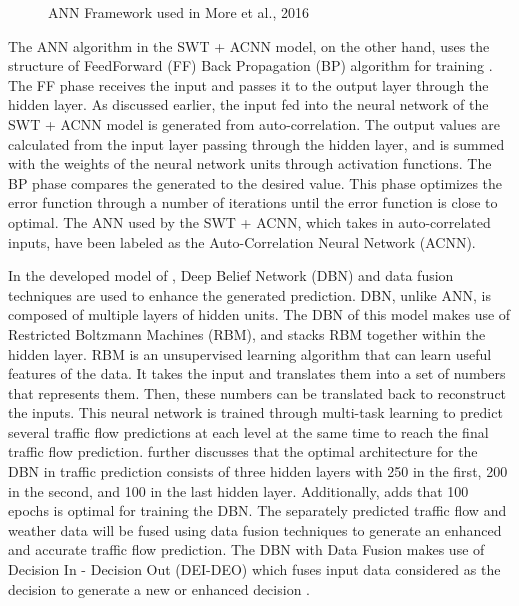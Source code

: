 \begin{figure}[h]
	\centering
	\captionsetup{justification=centering}
	\caption{ANN Framework used in More et al., 2016}
	\label{fig:annJordan}
\end{figure}

The ANN algorithm in the SWT + ACNN model, on the other hand, uses the structure of FeedForward (FF) Back Propagation (BP) algorithm for training . The FF phase receives the input and passes it to the output layer through the hidden layer. As discussed earlier, the input fed into the neural network of the SWT + ACNN model is generated from auto-correlation. The output values are calculated from the input layer passing through the hidden layer, and is summed with the weights of the neural network units through activation functions. The BP phase compares the generated to the desired value. This phase optimizes the error function through a number of iterations until the error function is close to optimal. The ANN used by the SWT + ACNN, which takes in auto-correlated inputs, have been labeled as the Auto-Correlation Neural Network (ACNN).

In the developed model of , Deep Belief Network (DBN) and data fusion techniques are used to enhance the generated prediction. DBN, unlike ANN, is composed of multiple layers of hidden units. The DBN of this model makes use of Restricted Boltzmann Machines (RBM), and stacks RBM together within the hidden layer. RBM is an unsupervised learning algorithm that can learn useful features of the data. It takes the input and translates them into a set of numbers that represents them. Then, these numbers can be translated back to reconstruct the inputs. This neural network is trained through multi-task learning to predict several traffic flow predictions at each level at the same time to reach the final traffic flow prediction.  further discusses that the optimal architecture for the DBN in traffic prediction consists of three hidden layers with 250 in the first, 200 in the second, and 100 in the last hidden layer. Additionally,  adds that 100 epochs is optimal for training the DBN. The separately predicted traffic flow and weather data will be fused using data fusion techniques to generate an enhanced and accurate traffic flow prediction. The DBN with Data Fusion makes use of Decision In - Decision Out (DEI-DEO) which fuses input data considered as the decision to generate a new or enhanced decision .

